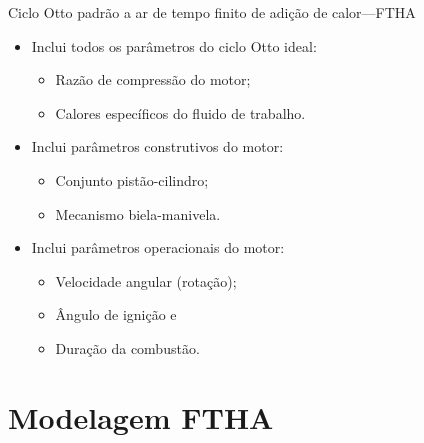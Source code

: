    \begin{frame}{Ciclo Otto padrão a ar de tempo finito de adição de calor---FTHA}\vspace*{-2em}
        \begin{itemize}
            \item<1->  Inclui todos os parâmetros do \alert{ciclo Otto ideal}:
            \begin{itemize}
                \item<2->  \alert{Razão de compressão} do motor;
                \item<3->  \alert{Calores específicos} do fluido de trabalho.
            \end{itemize}
            \item<4->  Inclui parâmetros \alert{construtivos} do \alert{motor}:
            \begin{itemize}
                \item<5->  Conjunto \alert{pistão-cilindro};
                \item<6->  Mecanismo \alert{biela-manivela}.
            \end{itemize}
            \item<7->  Inclui parâmetros \alert{operacionais} do \alert{motor}:
            \begin{itemize}
                \item<8->  \alert{Velocidade angular} (rotação);
                \item<9->  Ângulo de \alert{ignição} e
                \item<10-> \alert{Duração da combustão}.
            \end{itemize}
        \end{itemize}
    \end{frame}

\section{Modelagem FTHA}


